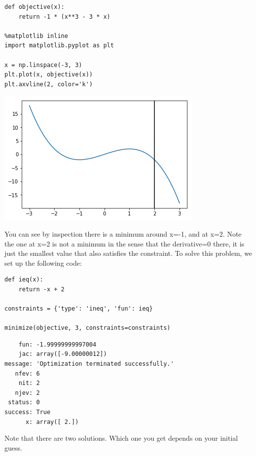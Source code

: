 \documentclass[11pt]{article}
\begin{document}
\begin{verbatim}
def objective(x):
    return -1 * (x**3 - 3 * x)

%matplotlib inline
import matplotlib.pyplot as plt

x = np.linspace(-3, 3)
plt.plot(x, objective(x))
plt.axvline(2, color='k')
\end{verbatim}

\begin{center}
\includegraphics[width=.9\linewidth]{obipy-resources/e6e76468db53af7dc15a5007a7e59920-658373ja.png}
\end{center}

You can see by inspection there is a minimum around x=-1, and at x=2. Note the one at x=2 is not a minimum in the sense that the derivative=0 there, it is just the smallest value that also satisfies the constraint. To solve this problem, we set up the following code:

\begin{verbatim}
def ieq(x):
    return -x + 2

constraints = {'type': 'ineq', 'fun': ieq}

minimize(objective, 3, constraints=constraints)
\end{verbatim}

\begin{verbatim}
    fun: -1.99999999997004
    jac: array([-9.00000012])
message: 'Optimization terminated successfully.'
   nfev: 6
    nit: 2
   njev: 2
 status: 0
success: True
      x: array([ 2.])
\end{verbatim}

Note that there are two solutions. Which one you get depends on your initial guess.
\end{document}

